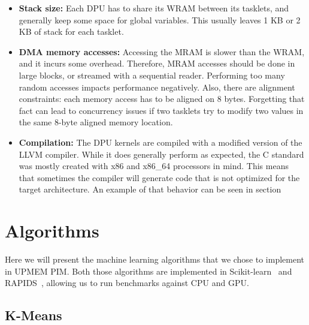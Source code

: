 \begin{itemize}
    \item \textbf{Stack size:} Each DPU has to share its WRAM between its tasklets, and generally keep some space for global variables. This usually leaves 1 KB or 2 KB of stack for each tasklet.
    \item \textbf{DMA memory accesses:} Accessing the MRAM is slower than the WRAM, and it incurs some overhead. Therefore, MRAM accesses should be done in large blocks, or streamed with a sequential reader. Performing too many random accesses impacts performance negatively. Also, there are alignment constraints: each memory access has to be aligned on 8 bytes. Forgetting that fact can lead to concurrency issues if two tasklets try to modify two values in the same 8-byte aligned memory location.
    \item \textbf{Compilation:} The DPU kernels are compiled with a modified version of the LLVM compiler. While it does generally perform as expected, the C standard was mostly created with x86 and x86\_64 processors in mind. This means that sometimes the compiler will generate code that is not optimized for the target architecture. An example of that behavior can be seen in section %
\end{itemize}

\section{Algorithms}

Here we will present the machine learning algorithms that we chose to implement in UPMEM PIM. Both those algorithms are implemented in Scikit-learn~\cite{pedregosa2011scikit} and RAPIDS~\cite{rapids}, allowing us to run benchmarks against CPU and GPU.

\subsection{K-Means}

